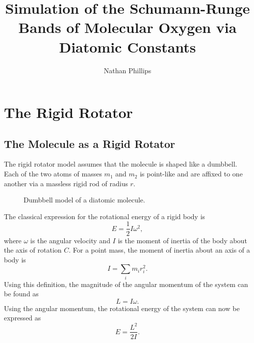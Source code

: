 \documentclass[11pt, twoside, fleqn]{report}
\title{Simulation of the Schumann-Runge Bands of Molecular Oxygen via Diatomic Constants}
\author{Nathan Phillips}
\DeclareRobustCommand\_{\ifmmode\expandafter\subtxt\else\textunderscore\fi}
\begin{document}
\maketitle
\tableofcontents
\newpage
\listoffigures
\newpage
\listoftables
\newpage

\chapter{The Rigid Rotator}
\label{c:the_rigid_rotator}

\section{The Molecule as a Rigid Rotator}
\label{s:the_molecule_as_a_rigid_rotator}

The rigid rotator model assumes that the molecule is shaped like a dumbbell. Each of the two atoms of masses $m_1$ and $m_2$ is point-like and are affixed to one another via a massless rigid rod of radius $r$.

\begin{figure}[H]
    \centering
    \caption{Dumbbell model of a diatomic molecule.}
    \label{f:dumbbell_model}
\end{figure}

The classical expression for the rotational energy of a rigid body is
\begin{equation*}
    E = \frac{1}{2}I\omega^2,
\end{equation*}
where $\omega$ is the angular velocity and $I$ is the moment of inertia of the body about the axis of rotation $C$. For a point mass, the moment of inertia about an axis of a body is
\begin{equation*}
    I = \sum_i m_i r_i^2.
\end{equation*}
Using this definition, the magnitude of the angular momentum of the system can be found as
\begin{equation*}
    L = I\omega.
\end{equation*}
Using the angular momentum, the rotational energy of the system can now be expressed as
\begin{equation*}
    E = \frac{L^2}{2I}.
\end{equation*}
\end{document}
